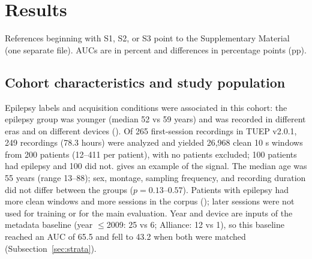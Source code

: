 \section{Results}\label{sec:results}

References beginning with S1, S2, or S3 point to the Supplementary Material (one separate file). AUCs are in percent and differences in percentage points (pp).

\subsection{Cohort characteristics and study population}\label{sec:populasi}

Epilepsy labels and acquisition conditions were associated in this cohort: the epilepsy group was younger (median 52 vs 59 years) and was recorded in different eras and on different devices ().
Of 265 first-session recordings in TUEP v2.0.1, 249 recordings (78.3 hours) were analyzed and yielded 26,968 clean 10 s windows from 200 patients (12--411 per patient), with no patients excluded; 100 patients had epilepsy and 100 did not.  gives an example of the signal.
The median age was 55 years (range 13--88); sex, montage, sampling frequency, and recording duration did not differ between the groups ($p = 0.13$--$0.57$).
Patients with epilepsy had more clean windows and more sessions in the corpus (); later sessions were not used for training or for the main evaluation.
Year and device are inputs of the metadata baseline (year $\leq$2009: 25 vs 6; Alliance: 12 vs 1), so this baseline reached an AUC of 65.5 and fell to 43.2 when both were matched (Subsection~\ref{sec:strata}).

